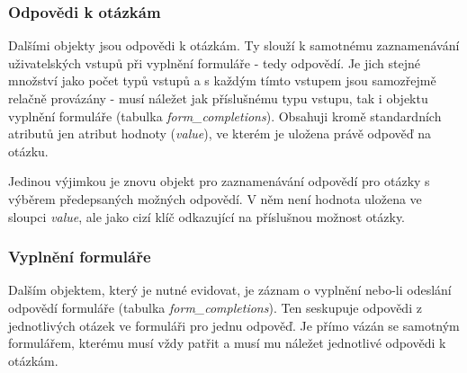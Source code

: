 	\subsubsection{Odpovědi k otázkám}
	Dalšími objekty jsou odpovědi k otázkám. Ty slouží k samotnému zaznamenávání uživatelských vstupů při vyplnění formuláře - tedy odpovědí. Je jich stejné množství jako počet typů vstupů a s každým tímto vstupem jsou samozřejmě relačně provázány - musí náležet jak příslušnému typu vstupu, tak i objektu vyplnění formuláře (tabulka \textit{form\_completions}). Obsahuji kromě standardních atributů jen atribut hodnoty (\textit{value}), ve kterém je uložena právě odpověď na otázku.
	
	Jedinou výjimkou je znovu objekt pro zaznamenávání odpovědí pro otázky s výběrem předepsaných možných odpovědí. V něm není hodnota uložena ve sloupci \textit{value}, ale jako cizí klíč odkazující na příslušnou možnost otázky.
	
	\subsubsection{Vyplnění formuláře}
	Dalším objektem, který je nutné evidovat, je záznam o vyplnění nebo-li odeslání odpovědí formuláře (tabulka \textit{form\_completions}). Ten seskupuje odpovědi z jednotlivých otázek ve formuláři pro jednu odpověď. Je přímo vázán se samotným formulářem, kterému musí vždy patřit a musí mu náležet jednotlivé odpovědi k otázkám.
	
	
	
